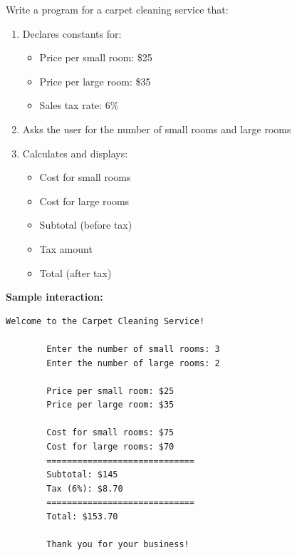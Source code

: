 \begin{example}{\leavevmode}
	
	Write a program for a carpet cleaning service that:
	\begin{enumerate}
		\item Declares constants for:
		\begin{itemize}
			\item Price per small room: \$25
			\item Price per large room: \$35
			\item Sales tax rate: 6\%
		\end{itemize}
		\item Asks the user for the number of small rooms and large rooms
		\item Calculates and displays:
		\begin{itemize}
			\item Cost for small rooms
			\item Cost for large rooms
			\item Subtotal (before tax)
			\item Tax amount
			\item Total (after tax)
		\end{itemize}
	\end{enumerate}
	
	\textbf{Sample interaction:}
	\begin{lstlisting}[numbers=none]
		Welcome to the Carpet Cleaning Service!
		
		Enter the number of small rooms: 3
		Enter the number of large rooms: 2
		
		Price per small room: $25
		Price per large room: $35
		
		Cost for small rooms: $75
		Cost for large rooms: $70
		=============================
		Subtotal: $145
		Tax (6%): $8.70
		=============================
		Total: $153.70
		
		Thank you for your business!
	\end{lstlisting}
\end{example}